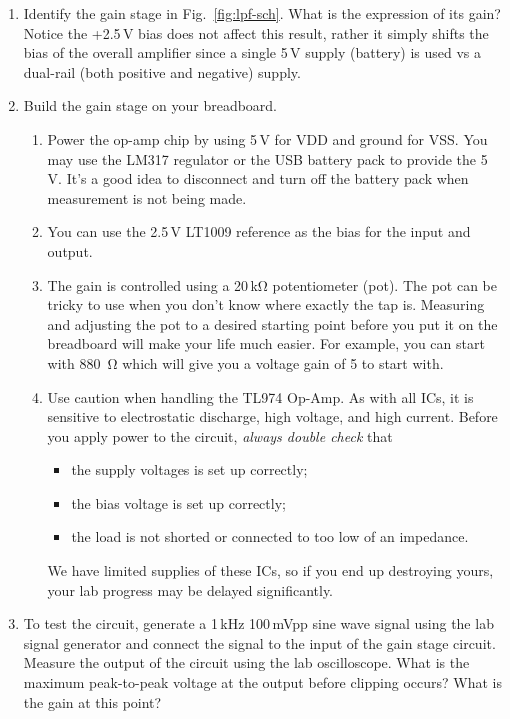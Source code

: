 \documentclass[letterpaper, 11pt]{article}
\begin{document}
\begin{enumerate}

	\item Identify the gain stage in Fig.~\ref{fig:lpf-sch}. What is the expression of its gain? Notice the +2.5\,V bias does not affect this result, rather it simply shifts the bias of the overall amplifier since a single 5\,V supply (battery) is used vs a dual-rail (both positive and negative) supply.
	
	\item Build the gain stage on your breadboard. 
		\begin{enumerate}
			\item Power the op-amp chip by using 5\,V for VDD and ground for VSS. You may use the LM317 regulator or the USB battery  pack to provide the 5\,V. It's a good idea to disconnect and turn off the battery pack when measurement is not being made.
			
			\item You can use the 2.5\,V LT1009 reference as the bias for the input and output. 
			
			\item The gain is controlled using a 20\,k\si{\ohm} potentiometer (pot). The pot can be tricky to use when you don't know where exactly the tap is. Measuring and adjusting the pot to a desired starting point before you put it on the breadboard will make your life much easier. For example, you can start with \SI{880}{\ohm} which will give you a voltage gain of 5 to start with. 
			
			\item Use caution when handling the TL974 Op-Amp. As with all ICs, it is sensitive to electrostatic discharge, high voltage, and high current. Before you apply power to the circuit, \textit{always double check} that 
				\begin{itemize}
					\item the supply voltages is set up correctly;
					\item the bias voltage is set up correctly;
					\item the load is not shorted or connected to too low of an impedance.
				\end{itemize}
			We have limited supplies of these ICs, so if you end up destroying yours, your lab progress may be delayed significantly. 
		\end{enumerate}

	\item To test the circuit, generate a 1\,kHz 100\,mVpp sine wave signal using the lab signal generator and connect the signal to the input of the gain stage circuit. Measure the output of the circuit using the lab oscilloscope. What is the maximum peak-to-peak voltage at the output before clipping occurs? What is the gain at this point?
	

\end{enumerate}
\end{document}

